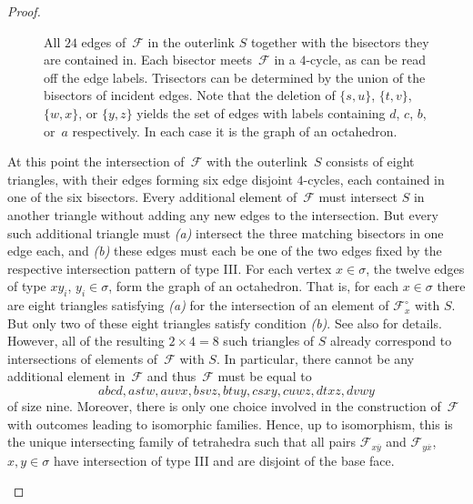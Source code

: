 \documentclass[a4paper,12pt]{amsart}
\theoremstyle{plain}
\theoremstyle{definition}
\newcommand{\family}{\mathcal F}
\newcommand{\face}{\sigma}
\begin{document}
\begin{proof}
\begin{enumerate}
\begin{figure}
\begin{center}
  \end{center}
  \caption{All $24$ edges of~$\family$ in the outerlink $S$ together with the bisectors they are contained in. Each bisector meets~$\family$ in a $4$-cycle, as can be read off the edge labels. Trisectors can be determined by the union of the bisectors of incident edges. Note that the deletion of $\{s,u\}$, $\{t,v\}$, $\{w,x\}$, or $\{y,z\}$ yields the set of edges with labels containing $d$, $c$, $b$, or~$a$ respectively. In each case it is the graph of an octahedron. \label{fig:typeIII}}
\end{figure}

At this point the intersection of~$\family$ with the outerlink~$S$ consists of eight triangles, with their edges forming six edge disjoint $4$-cycles, each contained in one of the six bisectors. Every additional element of~$\family$ must intersect $S$ in another triangle without adding any new edges to the intersection. But every such additional triangle must {\em (a)} intersect the three matching bisectors in one edge each, and {\em (b)} these edges must each be one of the two edges fixed by the respective intersection pattern of type III. For each vertex $x \in  \face$, the twelve edges of type $xy_i$, $y_i \in \face$, form the graph of an octahedron. That is, for each $x \in \face$ there are eight triangles satisfying {\em (a)} for the intersection of an element of $\family_x^{\circ}$ with $S$. But only two of these eight triangles satisfy condition {\em (b)}. See also  for details. However, all of the resulting $2 \times 4 = 8$ such triangles of $S$ already correspond to intersections of elements of~$\family$ with $S$. In particular, there cannot be any additional element in~$\family$ and thus~$\family$ must be equal to
\[
 abcd, astw, auvx, bsvz, btuy, csxy, cuwz, dtxz, dvwy 
\]
of size nine. Moreover, there is only one choice involved in the construction of~$\family$ with outcomes leading to isomorphic families. Hence, up to isomorphism, this is the unique intersecting family of tetrahedra such that all pairs $\family_{x\overline y}$ and $\family_{y \overline x}$, $x,y \in \face$ have intersection of type III and are disjoint of the base face.



\end{enumerate}
\end{proof}
\end{document}
